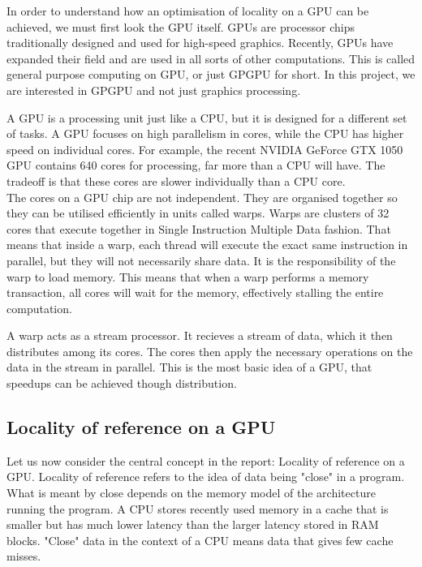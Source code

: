 \documentclass{article}
\begin{document}
In order to understand how an optimisation of locality on a GPU can be achieved, we must first look the GPU itself. GPUs are processor chips traditionally
designed and used for high-speed graphics. Recently, GPUs have expanded their field and are used in all sorts of other computations. This is called general
purpose computing on GPU, or just GPGPU for short. In this project, we are interested in GPGPU and not just graphics processing.

A GPU is a processing unit just like a CPU, but it is designed for a different set of tasks. A GPU focuses on high parallelism in cores, while the CPU has 
higher speed on individual cores. For example, the recent NVIDIA GeForce GTX 1050 GPU contains 640 cores for processing, far more than a CPU will have. The
tradeoff is that these cores are slower individually than a CPU core.\\

The cores on a GPU chip are not independent. They are organised together so they can be utilised efficiently in units called warps.
Warps are clusters of 32 cores that execute together in Single Instruction Multiple Data fashion. That means that inside a warp, each thread will execute the
exact same instruction in parallel, but they will not necessarily share data. It is the responsibility of the warp to load memory. This means that when a warp
performs a memory transaction, all cores will wait for the memory, effectively stalling the entire computation.

A warp acts as a stream processor. It recieves a stream of data, which it then distributes among its cores. The cores then apply the necessary operations on the
data in the stream in parallel. This is the most basic idea of a GPU, that speedups can be achieved though distribution.


\subsection{Locality of reference on a GPU}

Let us now consider the central concept in the report: Locality of reference on a GPU\@. Locality of reference refers to the idea of data being "close" in a
program. What is meant by close depends on the memory model of the architecture running the program. A CPU stores recently used memory in a cache that is
smaller but has much lower latency than the larger latency stored in RAM blocks. "Close" data in the context of a CPU means data that gives few cache misses.
\end{document}
